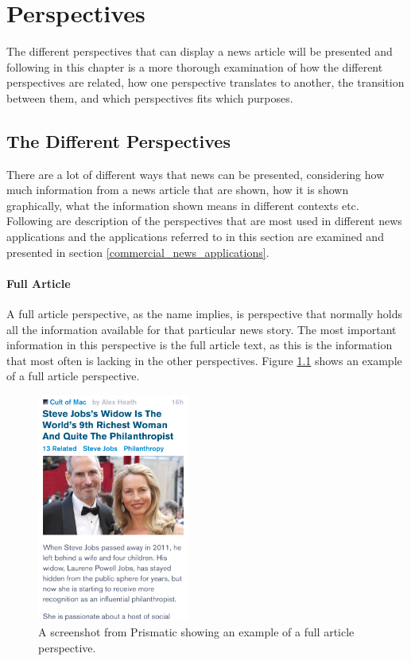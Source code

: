\chapter{Perspectives}
\label{chapter_perspectives}
The different perspectives that can display a news article will be presented and following in this chapter is a more thorough examination of how the different perspectives are related, how one perspective translates to another, the transition between them, and which perspectives fits which purposes.


\section{The Different Perspectives}
\label{perspectives_presentation}
There are a lot of different ways that news can be presented, considering how much information from a news article that are shown, how it is shown graphically, what the information shown means in different contexts etc. Following are description of the perspectives that are most used in different news applications and the applications referred to in this section are examined and presented in section \ref{commercial_news_applications}.

\subsubsection{Full Article}
A full article perspective, as the name implies, is perspective that normally holds all the information available for that particular news story. The most important information in this perspective is the full article text, as this is the information that most often is lacking in the other perspectives. Figure \ref{full_article_prismatic} shows an example of a full article perspective.

\begin{figure}[!htbp]
\centering
\includegraphics[width=50mm]{GFX/perspectives/fullArticleViewPrismatic.png}
\caption{A screenshot from Prismatic showing an example of a full article perspective.}
\label{full_article_prismatic}
\end{figure}

